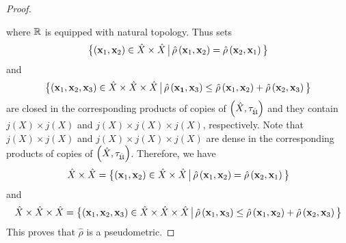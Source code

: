 \begin{proof}
\begin{center}
\end{center}
where ${\mathbb R}$ is equipped with natural topology. Thus sets
$$\big\{(\mathbf{x}_1,\mathbf{x}_2)\in \hat{X}\times \hat{X}\,\big|\,\hat{\rho}\left(\mathbf{x}_1,\mathbf{x}_2\right) = \hat{\rho}\left(\mathbf{x}_2,\mathbf{x}_1\right)\big\}$$
and
$$\big\{(\mathbf{x}_1,\mathbf{x}_2,\mathbf{x}_3)\in \hat{X}\times \hat{X}\times \hat{X}\,\big|\,\hat{\rho}\left(\mathbf{x_1},\mathbf{x}_3\right) \leq  \hat{\rho}\left(\mathbf{x}_1,\mathbf{x}_2\right) + \hat{\rho}\left(\mathbf{x}_2,\mathbf{x}_3\right)\big\}$$
are closed in the corresponding products of copies of $\left(\hat{X},\tau_{\hat{{\mathfrak U}}}\right)$ and they contain $j(X)\times j(X)$ and $j(X)\times j(X)\times j(X)$, respectively. Note that $j(X)\times j(X)$ and $j(X)\times j(X)\times j(X)$ are dense in the corresponding products of copies of $\left(\hat{X},\tau_{\hat{{\mathfrak U}}}\right)$. Therefore, we have
$$\hat{X}\times \hat{X} = \big\{(\mathbf{x}_1,\mathbf{x}_2)\in \hat{X}\times \hat{X}\,\big|\,\hat{\rho}\left(\mathbf{x}_1,\mathbf{x}_2\right) = \hat{\rho}\left(\mathbf{x}_2,\mathbf{x}_1\right)\big\}$$
and
$$\hat{X}\times \hat{X}\times \hat{X} = \big\{(\mathbf{x}_1,\mathbf{x}_2,\mathbf{x}_3)\in \hat{X}\times \hat{X}\times \hat{X}\,\big|\,\hat{\rho}\left(\mathbf{x}_1,\mathbf{x}_3\right) \leq  \hat{\rho}\left(\mathbf{x}_1,\mathbf{x}_2\right) + \hat{\rho}\left(\mathbf{x}_2,\mathbf{x}_3\right)\big\}$$
This proves that $\hat{\rho}$ is a pseudometric.
\end{proof}


